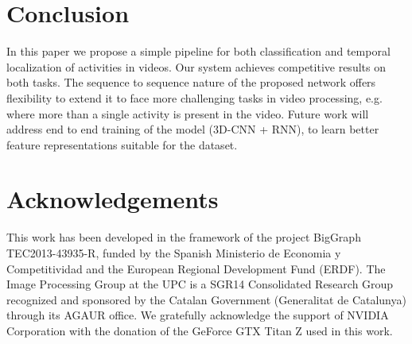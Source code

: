 \documentclass{article}
\begin{document}

\section{Conclusion}

In this paper we propose a simple pipeline for both classification and temporal localization of activities in videos. Our system achieves competitive results on both tasks. The sequence to sequence nature of the proposed network offers flexibility to extend it to face more challenging tasks in video processing, e.g. where more than a single activity is present in the video. Future work will address end to end training of the model (3D-CNN + RNN), to learn better feature representations suitable for the dataset.


\section{Acknowledgements}

This work has been developed in the framework of the project BigGraph TEC2013-43935-R, funded by the Spanish Ministerio de Economia y Competitividad and the European Regional Development Fund (ERDF). The Image Processing Group at the UPC is a SGR14 Consolidated Research Group recognized and sponsored by the Catalan Government (Generalitat de Catalunya) through its AGAUR office. We gratefully acknowledge the support of NVIDIA Corporation with the donation of the GeForce GTX Titan Z used in this work.

\section*{}{\small


}
\end{document}
